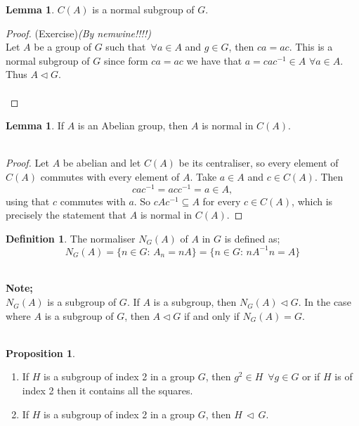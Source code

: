 \documentclass[11pt,a4paper]{article}
\theoremstyle{definition}
\newtheorem{defn}[thm]{Definition}
\newtheorem{prop}[thm]{Proposition}
\newtheorem{lem}[thm]{Lemma}
\begin{document}
\begin{lem}
$C(A)$ is a normal subgroup of $G$.\\



\begin{proof}
(Exercise)\textit{(By nemwine!!!!)}\\
Let $A$ be a group of $G$ such that $\, \forall a\in A$ and $g\in G$, then $ca = ac$. This is a normal subgroup of $G$ since form $ca = ac$ we have that $a = cac^{-1}\in A\,\, \forall a\in A$. Thus $A\lhd G$.\\\\
\end{proof}
\end{lem}




\begin{lem}
If $A$ is an Abelian group, then $A$ is normal in $C(A)$.\\\\
\end{lem}

\begin{proof}
Let $A$ be abelian and let $C(A)$ be its centraliser, so every element of $C(A)$
commutes with every element of $A$. Take $a\in A$ and $c\in C(A)$. Then
$$cac^{-1} = acc^{-1} = a \in A ,$$
using that $c$ commutes with $a$. So $cAc^{-1}\subseteq A$ for every
$c\in C(A)$, which is precisely the statement that $A$ is normal in $C(A)$.
\end{proof}



\begin{defn}
The normaliser $N_G(A)$ of $A$ in $G$ is defined as; $$N_G(A) = \{n\in G:\, A_n = nA\} = \{n\in G:\, nA^{-1}n = A\}$$\\
\end{defn}




\textbf{Note;}\\
$N_G(A)$ is a subgroup of $G$. If $A$ is a subgroup, then $N_G(A)\lhd G$. In the case where $A$ is a subgroup of $G$, then $A\lhd G$ if and only if $N_G(A) = G$.\\\\














\begin{prop}
\begin{enumerate}
\item[(i)] If $H$ is a subgroup of index 2 in a group $G$, then $g^2\in H\,\,\, \forall g\in G$ or if $H$ is of index 2 then it contains all the squares.
\item[(ii)] If $H$ is a subgroup of index 2 in a group $G$, then $H\,\vartriangleleft\, G$.\\
\end{enumerate}
\end{prop}
\end{document}
